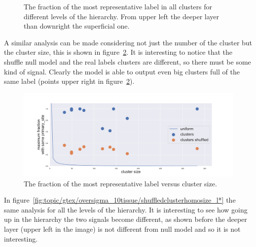 \begin{figure}[htb!]
\begin{minipage}{0.45\textwidth}
    \end{minipage}
    \caption{The fraction of the most representative label in all clusters for different levels of the hierarchy. From upper left the deeper layer than downright the superficial one.}
    \label{fig:topic/gtex/oversigma_10tissue/shuffledcluster_maximum*}
\end{figure}

A similar analysis can be made considering not just the number of the cluster but the cluster size, this is shown in figure~\ref{fig:topic/gtex/oversigma_10tissue/shuffledclusterhomosize_l3_primary_site}. It is interesting to notice that the shuffle null model and the real labels clusters are different, so there must be some kind of signal. Clearly the model is able to output even big clusters full of the same label (points upper right in figure~\ref{fig:topic/gtex/oversigma_10tissue/shuffledclusterhomosize_l3_primary_site}).
\begin{figure}[htb!]
	\centering
	\includegraphics[width=0.9\linewidth]{pictures/topic/gtex/oversigma_10tissue/shuffledclusterhomosize_l3_primary_site.pdf}
	\caption{The fraction of the most representative label versus cluster size.}
	\label{fig:topic/gtex/oversigma_10tissue/shuffledclusterhomosize_l3_primary_site}
\end{figure}
In figure~\ref{fig:topic/gtex/oversigma_10tissue/shuffledclusterhomosize_l*} the same analysis for all the levels of the hierarchy. It is interesting to see how going up in the hierarchy the two signals become different, as shown before the deeper layer (upper left in the image) is not different from null model and so it is not interesting.
